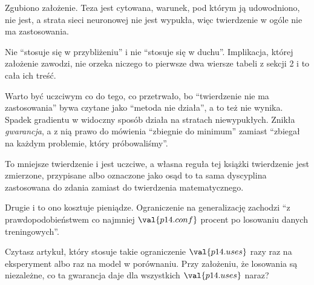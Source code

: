 \begin{fr}
\begin{ansblock}
Zgubiono założenie. Teza jest cytowana, warunek, pod którym ją udowodniono,
nie jest, a strata sieci neuronowej nie jest wypukła, więc twierdzenie w ogóle
nie ma zastosowania.
\end{ansblock}

Nie \enquote{stosuje się w przybliżeniu} i nie \enquote{stosuje się w
duchu}. Implikacja, której założenie zawodzi, nie orzeka niczego \dash{} to
pierwsze dwa wiersze tabeli z sekcji 2 i to cała ich treść.

\begin{note}
Warto być uczciwym co do tego, co przetrwało, bo \enquote{twierdzenie nie ma
zastosowania} bywa czytane jako \enquote{metoda nie działa}, a to też nie
wynika. Spadek gradientu w widoczny sposób działa na stratach niewypukłych.
Znikła \emph{gwarancja}, a z nią prawo do mówienia \enquote{zbiegnie do
minimum} zamiast \enquote{zbiegał na każdym problemie, który próbowaliśmy}.

To mniejsze twierdzenie i jest uczciwe, a własna reguła tej książki \dash{}
twierdzenie jest zmierzone, przypisane albo oznaczone jako osąd \dash{} to ta
sama dyscyplina zastosowana do zdania zamiast do twierdzenia matematycznego.
\end{note}
\end{fr}

\begin{fr}
Drugie i to ono kosztuje pieniądze. Ograniczenie na generalizację zachodzi
\enquote{z prawdopodobieństwem co najmniej $\val{p14.conf}$ procent po
losowaniu danych treningowych}.

Czytasz artykuł, który stosuje takie ograniczenie $\val{p14.uses}$ razy
\dash{} raz na eksperyment albo raz na model w porównaniu. Przy założeniu, że
losowania są niezależne, co ta gwarancja daje dla wszystkich
$\val{p14.uses}$ naraz?
\dotline
\nextframe
\end{fr}

